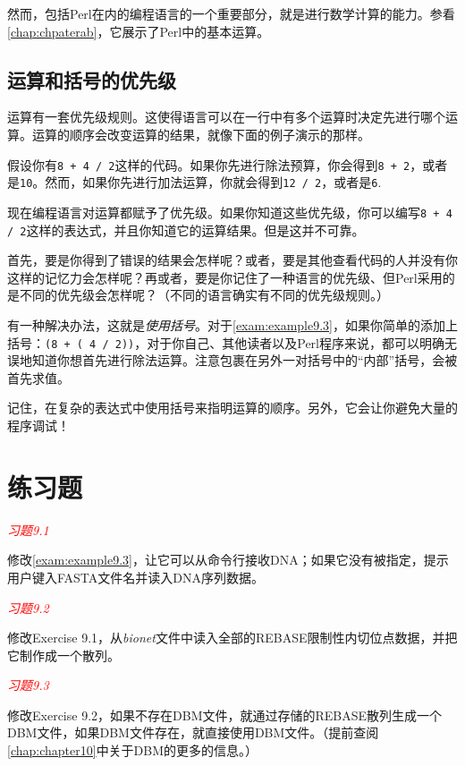 然而，包括Perl在内的编程语言的一个重要部分，就是进行数学计算的能力。参看\autoref{chap:chpaterab}，它展示了Perl中的基本运算。

\subsection{运算和括号的优先级}
运算有一套优先级规则。这使得语言可以在一行中有多个运算时决定先进行哪个运算。运算的顺序会改变运算的结果，就像下面的例子演示的那样。

假设你有\verb|8 + 4 / 2|这样的代码。如果你先进行除法预算，你会得到\verb|8 + 2|，或者是\verb|10|。然而，如果你先进行加法运算，你就会得到\verb|12 / 2|，或者是\verb|6|.

现在编程语言对运算都赋予了优先级。如果你知道这些优先级，你可以编写\verb|8 + 4 / 2|这样的表达式，并且你知道它的运算结果。但是这并不可靠。

首先，要是你得到了错误的结果会怎样呢？或者，要是其他查看代码的人并没有你这样的记忆力会怎样呢？再或者，要是你记住了一种语言的优先级、但Perl采用的是不同的优先级会怎样呢？（不同的语言确实有不同的优先级规则。）

有一种解决办法，这就是\textit{使用括号}。对于\autoref{exam:example9.3}，如果你简单的添加上括号：\verb|(8 + ( 4 / 2))|，对于你自己、其他读者以及Perl程序来说，都可以明确无误地知道你想首先进行除法运算。注意包裹在另外一对括号中的“内部”括号，会被首先求值。

记住，在复杂的表达式中使用括号来指明运算的顺序。另外，它会让你避免大量的程序调试！

\section{练习题}
\textcolor{red}{\textit{习题9.1}}
\begin{adjustwidth}{1cm}{}
修改\autoref{exam:example9.3}，让它可以从命令行接收DNA；如果它没有被指定，提示用户键入FASTA文件名并读入DNA序列数据。
\end{adjustwidth}

\textcolor{red}{\textit{习题9.2}}
\begin{adjustwidth}{1cm}{}
  修改Exercise
  9.1，从\textit{bionet}文件中读入全部的REBASE限制性内切位点数据，并把它制作成一个散列。
\end{adjustwidth}

\textcolor{red}{\textit{习题9.3}}
\begin{adjustwidth}{1cm}{}
修改Exercise 9.2，如果不存在DBM文件，就通过存储的REBASE散列生成一个DBM文件，如果DBM文件存在，就直接使用DBM文件。（提前查阅\autoref{chap:chapter10}中关于DBM的更多的信息。）
\end{adjustwidth}


